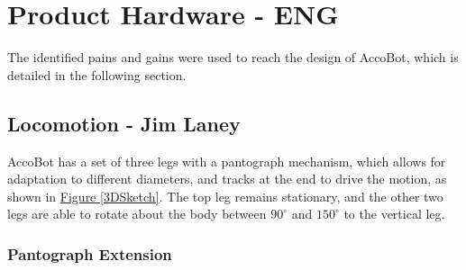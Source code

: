 \documentclass[11pt]{article}		%
\newcommand{\figref}[1]{\hyperref[#1]{Figure \ref*{#1}}}    %
\begin{document}
		\section{Product Hardware - ENG}
		
		The identified pains and gains were used to reach the design of AccoBot, which is detailed in the following section.
	
		\subsection[Locomotion]{Locomotion - Jim Laney} \label{Lomcotion}
		
			AccoBot has a set of three legs with a pantograph mechanism, which allows for adaptation to different diameters, and tracks at the end to drive the motion, as shown in \figref{3DSketch}.
			The top leg remains stationary, and the other two legs are able to rotate about the body between $90^\circ$ and $150^\circ$ to the vertical leg.
			
			\subsubsection{Pantograph Extension}
			
\end{document}
